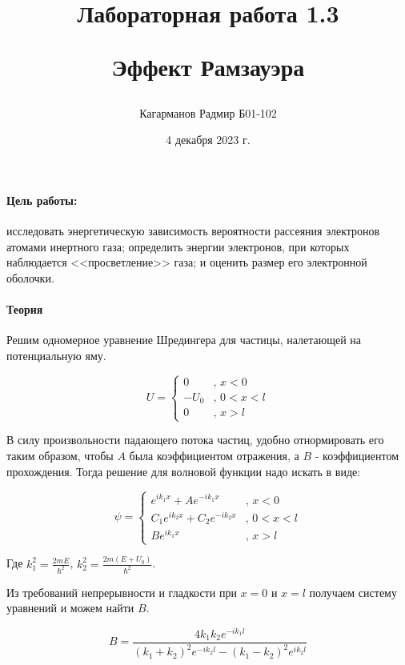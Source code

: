 \documentclass[a4paper,12pt]{article}
\title{Лабораторная работа 1.3

Эффект Рамзауэра}
\author{Кагарманов Радмир Б01-102}
\date{4 декабря 2023 г.}
\begin{document}
\maketitle
\thispagestyle{empty}
\newpage
\setcounter{page}{1}

\paragraph{Цель работы:} исследовать энергетическую зависимость вероятности рассеяния электронов атомами инертного газа; определить энергии электронов, при которых наблюдается <<просветление>> газа; и оценить размер его электронной оболочки.

\paragraph{Теория\\}
Решим одномерное уравнение Шредингера для частицы, налетающей на потенциальную яму.

\begin{equation*}
U = 
 \begin{cases}
   0 &\text{, $x < 0$}\\
   -U_0 &\text{, $0<x<l$}\\
   0 &\text{, $x > l$}
 \end{cases}
\end{equation*}

В силу произвольности падающего потока частиц, удобно отнормировать его таким образом, чтобы $A$ была коэффициентом отражения, а $B$ - коэффициентом прохождения. Тогда решение для волновой функции надо искать в виде:

\begin{equation*}
\psi = 
 \begin{cases}
   e^{ik_1 x} + Ae^{-ik_1 x} &\text{, $x < 0$}\\
   C_1 e^{ik_2 x} + C_2 e^{-ik_2 x} &\text{, $0<x<l$}\\
   Be^{ik_1 x} &\text{, $x > l$}
 \end{cases}
\end{equation*}

Где $k_1^2 = \frac{2mE}{\hbar^2}$, $k_2^2 = \frac{2m(E + U_0)}{\hbar^2}$.

Из требований непрерывности и гладкости при $x=0$ и $x=l$ получаем систему уравнений и можем найти $B$.

\begin{equation}
    B=\frac{4k_1 k_2 e^{-ik_1 l}}{(k_1 + k_2)^2 e^{-ik_2 l} - (k_1 - k_2)^2 e^{ik_2 l}}
\end{equation}
\end{document}

